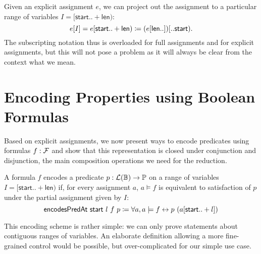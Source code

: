 
\newcommand{\projVars}{\textsf{projVars}}
Given an explicit assignment $e$, we can project out the assignment to a particular range of variables $I = [\textsf{start}.. +\textsf{len})$:
\[e[I] = e[\textsf{start}..+\textsf{len}) \coloneqq (e[\textsf{len} ..])[.. \textsf{start}).\] 
The subscripting notation thus is overloaded for full assignments and for explicit assignments, but this will not pose a problem as it will always be clear from the context what we mean.

\section{Encoding Properties using Boolean Formulas}
Based on explicit assignments, we now present ways to encode predicates using formulas $f : \mathcal{F}$ and show that this representation is closed under conjunction and disjunction, the main composition operations we need for the reduction.

\newcommand{\encodesPred}{\textsf{encodesPredAt}}
\begin{definition}
  \mnote[encodesPredicateAt]{\encodesPred}
  A formula $f$ encodes a predicate $p : \mathcal{L} (\mathbb{B}) \rightarrow \mathbb{P}$ on a range of variables $I = [\textsf{start}.. + \textsf{len})$ if, for every assignment $a$, $a \models f$ is equivalent to satisfaction of $p$ under the partial assignment given by $I$:
  \[\encodesPred~\textsf{start}~l~f~p \defeq \forall a, a \models f \leftrightarrow p~(a[\textsf{start}.. + l]) \]
\end{definition}

This encoding scheme is rather simple: we can only prove statements about contiguous ranges of variables. 
An elaborate definition allowing a more fine-grained control would be possible, but over-complicated for our simple use case.

